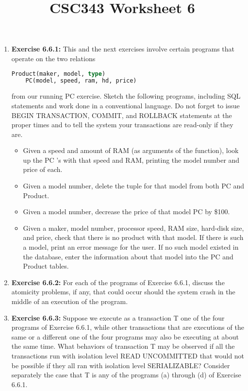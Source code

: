 \documentclass[12pt]{article}
\begin{document}
\title{CSC343 Worksheet 6}
\maketitle

\begin{enumerate}[1.]
    \item \textbf{Exercise 6.6.1:} This and the next exercises involve certain
    programs that operate on the two relations

    \begin{lstlisting}[language=SQL]
    Product(maker, model, type)
    PC(model, speed, ram, hd, price)
    \end{lstlisting}

    \bigskip

    from our running PC exercise. Sketch the following programs, including SQL
    statements and work done in a conventional language. Do not forget to issue
    BEGIN TRANSACTION, COMMIT, and ROLLBACK statements at the proper times
    and to tell the system your transactions are read-only if they are.

    \bigskip

    \begin{itemize}
        \item Given a speed and amount of RAM (as arguments of the function), look up the PC ’s with that speed and RAM, printing the model number and price of each.
        \item Given a model number, delete the tuple for that model from both PC and Product.
        \item Given a model number, decrease the price of that model PC by \$100.
        \item Given a maker, model number, processor speed, RAM size, hard-disk size, and price, check that there is no product with that model. If there is such a model, print an error message for the user. If no such model existed in the database, enter the information about that model into the PC and Product tables.
    \end{itemize}

    \item \textbf{Exercise 6.6.2:} For each of the programs of Exercise 6.6.1,
    discuss the atomicity problems, if any, that could occur should the system crash
    in the middle of an execution of the program.

    \item \textbf{Exercise 6.6.3:} Suppose we execute as a transaction T one of the four programs
    of Exercise 6.6.1, while other transactions that are executions of the same
    or a different one of the four programs may also be executing at about the same
    time. What behaviors of transaction T may be observed if all the transactions
    run with isolation level READ UNCOMMITTED that would not be possible if they
    all ran with isolation level SERIALIZABLE? Consider separately the case that T
    is any of the programs (a) through (d) of Exercise 6.6.1.


\end{enumerate}
\end{document}
